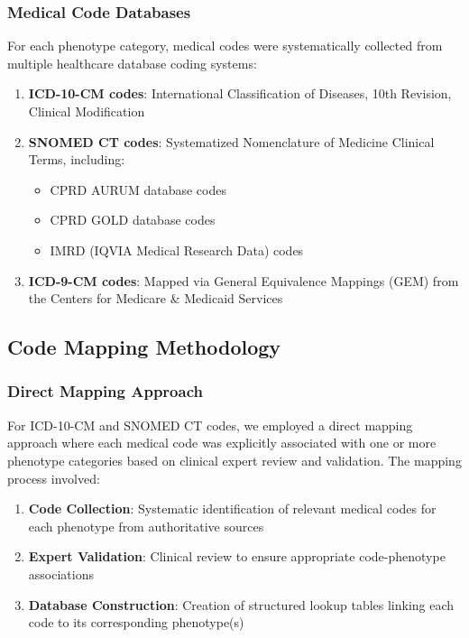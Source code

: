 \documentclass[11pt]{article}
\begin{document}
\subsubsection{Medical Code Databases}

For each phenotype category, medical codes were systematically collected from multiple healthcare database coding systems:

\begin{enumerate}
    \item \textbf{ICD-10-CM codes}: International Classification of Diseases, 10th Revision, Clinical Modification
    \item \textbf{SNOMED CT codes}: Systematized Nomenclature of Medicine Clinical Terms, including:
    \begin{itemize}
        \item CPRD AURUM database codes
        \item CPRD GOLD database codes  
        \item IMRD (IQVIA Medical Research Data) codes
    \end{itemize}
    \item \textbf{ICD-9-CM codes}: Mapped via General Equivalence Mappings (GEM) from the Centers for Medicare \& Medicaid Services
\end{enumerate}

\subsection{Code Mapping Methodology}

\subsubsection{Direct Mapping Approach}

For ICD-10-CM and SNOMED CT codes, we employed a direct mapping approach where each medical code was explicitly associated with one or more phenotype categories based on clinical expert review and validation. The mapping process involved:

\begin{enumerate}
    \item \textbf{Code Collection}: Systematic identification of relevant medical codes for each phenotype from authoritative sources
    \item \textbf{Expert Validation}: Clinical review to ensure appropriate code-phenotype associations
    \item \textbf{Database Construction}: Creation of structured lookup tables linking each code to its corresponding phenotype(s)
\end{enumerate}
\end{document}
